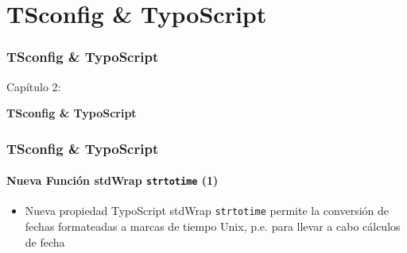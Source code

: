 %

\section{TSconfig \& TypoScript}
\begin{frame}[fragile]
	\frametitle{TSconfig \& TypoScript}

	\begin{center}\huge{Capítulo 2:}\end{center}
	\begin{center}\huge{\color{typo3darkgrey}\textbf{TSconfig \& TypoScript}}\end{center}

\end{frame}

\begin{frame}[fragile]
	\frametitle{TSconfig \& TypoScript}
	\framesubtitle{Nueva Función stdWrap \texttt{strtotime} (1)}

	\begin{itemize}

		\item Nueva propiedad TypoScript stdWrap \texttt{strtotime} permite la conversión de
			fechas formateadas a marcas de tiempo Unix, p.e. para llevar a cabo cálculos de fecha

	\end{itemize}

\end{frame}

